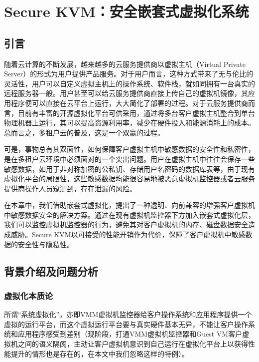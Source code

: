 
\chapter{Secure KVM：安全嵌套式虚拟化系统}
\label{chap:securekvm}



\section{引言}

随着云计算的不断发展，越来越多的云服务提供商以虚拟主机（Virtual Private Server）的形式为用户提供产品服务。对于用户而言，这种方式带来了无与伦比的灵活性，用户可以自定义虚拟主机上的操作系统、软件栈，就如同拥有一台真实的远程服务器一般。用户甚至可以给云服务提供商直接上传自己的虚拟机镜像，其应用程序便可以直接在云平台上运行，大大简化了部署的过程。对于云服务提供商而言，目前有丰富的开源虚拟化平台可供采用，通过将多台客户虚拟主机整合到单台物理机器上运行，其可以提高资源利用率，减少在硬件投入和能源消耗上的成本。总而言之，多租户云的普及，这是一个双赢的过程。

可是，事物总有其双面性，如何保障客户虚拟主机中敏感数据的安全性和私密性，是在多租户云环境中必须面对的一个突出问题。用户在虚拟主机中往往会保存一些敏感数据，如用于非对称加密的公私钥、存储用户名密码的数据库表等，由于现有虚拟化平台的局限性，这些敏感数据均能很容易地被恶意虚拟机监控器或者云服务提供商操作人员窥测到，存在泄漏的风险。

在本章中，我们借助嵌套式虚拟化，提出了一种透明、向前兼容的增强客户虚拟机中敏感数据安全的解决方案。通过在现有虚拟机监控器下方加入嵌套式虚拟化层，我们可以监控虚拟机监控器的行为，避免其对客户虚拟机的内存、磁盘数据安全造成威胁。Secure KVM以可接受的性能开销作为代价，保障了客户虚拟机中敏感数据的安全性与隐私性。

\section{背景介绍及问题分析}

\subsection{虚拟化本质论}

所谓“系统虚拟化”，亦即VMM虚拟机监控器给客户操作系统和应用程序提供一个虚拟的运行平台，而这个虚拟运行平台要与真实硬件基本无异，不能让客户操作系统和应用程序感受到差别（现阶段，打通VMM虚拟机监控器和Guest VM客户虚拟机之间的语义隔阂，主动让客户虚拟机意识到自己运行在虚拟化平台上以获得性能提升的情形也是存在的，在本文中我们忽略这样的特例）。

